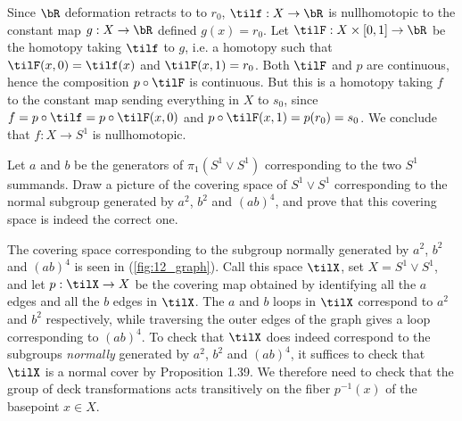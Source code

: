 \begin{homework}[e]
\begin{prf}
    Since $\bR$ deformation retracts to to $r_0$, $\tilf:X\to \bR$ is nullhomotopic to the constant map $g:X\to \bR$ defined $g(x) = r_0$. Let $\tilF:X\times [0,1]\to \bR$ be the homotopy taking $\tilf$ to $g$, i.e. a homotopy such that $\tilF(x,0) = \tilf(x)$ and $\tilF(x,1) = r_0$. Both $\tilF$ and $p$ are continuous, hence the composition $p\circ \tilF$ is continuous. But this is a homotopy taking $f$ to the constant map sending everything in $X$ to $s_0$, since $f = p\circ \tilf = p\circ \tilF(x,0)$ and $p\circ\tilF(x,1) = p(r_0) = s_0$. We conclude that $f:X\to S^1$ is nullhomotopic.
  \end{prf}
   Let $a$ and $b$ be the generators of $\pi_1(S^1 \vee S^1)$ corresponding to the two $S^1$ summands. Draw a picture of the covering space of $S^1 \vee S^1$ corresponding to the normal subgroup generated by $a^2$, $b^2$ and $(ab)^4$, and prove that this covering space is indeed the correct one.
\begin{prf}
    The covering space corresponding to the subgroup normally generated by $a^2$, $b^2$ and $(ab)^4$ is seen in (\ref{fig:12_graph}). Call this space $\tilX$, set $X = S^1 \vee S^1$, and let $p: \tilX \rightarrow X$ be the covering map obtained by identifying all the $a$ edges and all the $b$ edges in $\tilX$. The $a$ and $b$ loops in $\tilX$ correspond to $a^2$ and $b^2$ respectively, while traversing the outer edges of the graph gives a loop corresponding to $(ab)^4$. To check that $\tilX$ does indeed correspond to the subgroups \emph{normally} generated by $a^2$, $b^2$ and $(ab)^4$, it suffices to check that $\tilX$ is a normal cover by Proposition 1.39. We therefore need to check that the group of deck transformations acts transitively on the fiber $p^{-1}(x)$ of the basepoint $x \in X$. 


\end{prf}
\end{homework}
